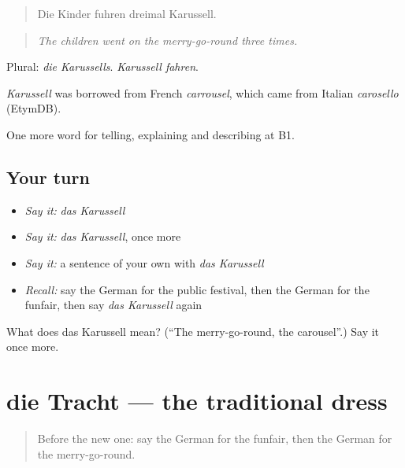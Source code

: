 \begin{quote}
Die Kinder fuhren dreimal Karussell.
\end{quote}

\begin{quote}
\emph{The children went on the merry-go-round three times.}
\end{quote}

Plural: \emph{die Karussells}. \emph{Karussell fahren}.

\begin{cousinweb}
\emph{Karussell} was borrowed from French \emph{carrousel}, which came from Italian \emph{carosello} (EtymDB).
\end{cousinweb}

\begin{grammarlens}[title={What you've built}]
One more word for telling, explaining and describing at B1.
\end{grammarlens}

\subsection*{Your turn}
\begin{itemize}
\raggedright
  \item \emph{Say it:} \emph{das Karussell}
  \item \emph{Say it:} \emph{das Karussell}, once more
  \item \emph{Say it:} a sentence of your own with \emph{das Karussell}
  \item \emph{Recall:} say the German for the public festival, then the German for the funfair, then say \emph{das Karussell} again
\end{itemize}

\begin{tcolorbox}[breakable,colback=teal!4,colframe=teal!35!black,title={Before you move on}]
What does das Karussell mean? (\textquotedblleft{}The merry-go-round, the carousel\textquotedblright{}.) Say it once more.
\end{tcolorbox}
\section[die Tracht]{die Tracht — the traditional dress}

\label{lesson:GE-C312-tracht}



\begin{quote}
Before the new one: say the German for the funfair, then the German for the merry-go-round.
\end{quote}

